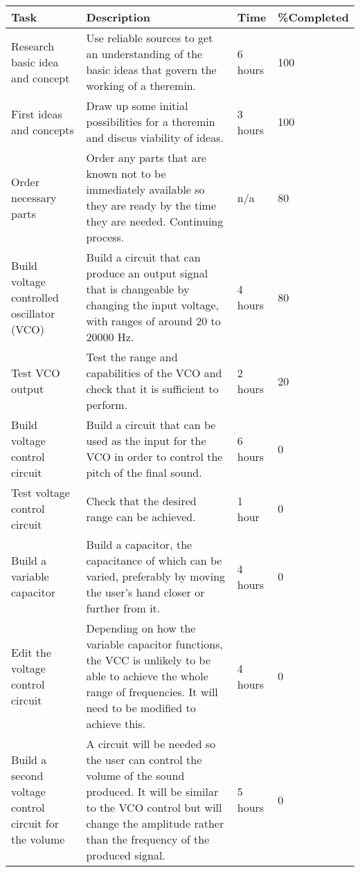 \documentclass[english]{article}
\providecommand{\tabularnewline}{\\}
\begin{document}
\begin{tabularx}{\textwidth}{|R|X|l|l|}
\hline 
Task & Description & Time & \%Completed\tabularnewline
\hline \hline 
Research basic idea and concept & Use reliable sources to get an understanding of the basic ideas that govern the working of a theremin. & 6 hours & 100\\ \hline 

First ideas and concepts & Draw up some initial possibilities for a theremin and discus viability of ideas. & 3 hours & 100\\ \hline 

Order necessary parts & Order any parts that are known not to be immediately available so they are ready by the time they are needed. Continuing process. & n/a & 80\\ \hline 

Build voltage controlled oscillator (VCO) & Build a circuit that can produce an output signal that is changeable by changing the input voltage, with ranges of around 20 to 20000 Hz. & 4 hours & 80\\ \hline 

Test VCO output & Test the range and capabilities of the VCO and check that it is sufficient to perform. & 2 hours & 20\\ \hline 

Build voltage control circuit & Build a circuit that can be used as the input for the VCO in order to control the pitch of the final sound. & 6 hours & 0\\ \hline 

Test voltage control circuit & Check that the desired range can be achieved. & 1 hour & 0\\ \hline 

Build a variable capacitor & Build a capacitor, the capacitance of which can be varied, preferably by moving the user's hand closer or further from it. & 4 hours & 0\\ \hline 

Edit the voltage control circuit & Depending on how the variable capacitor functions, the VCC is unlikely to be able to achieve the whole range of frequencies. It will need to be modified to achieve this. & 4 hours & 0\\ \hline 

Build a second voltage control circuit for the volume & A circuit will be needed so the user can control the volume of the sound produced. It will be similar to the VCO control but will change the amplitude rather than the frequency of the produced signal. & 5 hours & 0\\ \hline 


\end{tabularx}
\end{document}
